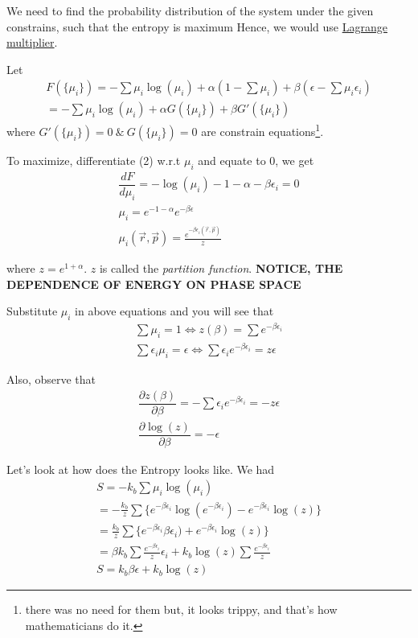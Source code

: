 \documentclass{tufte-handout}
\begin{document}
We need to find the probability distribution of the system under the given constrains, such that 
the entropy is maximum Hence, we would use \href{https://en.wikipedia.org/wiki/Lagrange_multiplier}{Lagrange 
multiplier}. 

Let 
\[\begin{gathered}
	F(\{\mu_i\}) = - \sum \mu_i \log(\mu_i) + \alpha (1 - 
\sum \mu_i) + \beta (\epsilon - \sum \mu_i \epsilon_i) \\
= - \sum \mu_i \log(\mu_i) + \alpha G(\{\mu_i\}) + \beta G'(\{\mu_i\}) \tag*{2}
\end{gathered}\] 
where \(G'(\{\mu_i\}) = 0 \ \& \ G(\{\mu_i\}) = 0\) are constrain equations\footnote{
	there was no need for them but, it looks trippy, and that's how mathematicians do it. 
}. 

To maximize, differentiate (2) w.r.t \(\mu_i\) and equate to \(0\), we get
\[\begin{gathered}
	\dfrac{d F}{d \mu_i}= - \log(\mu_i) - 1 - \alpha - \beta  \epsilon_i =0 \\
	\mu_i = e^{-1 - \alpha} e^{-\beta \epsilon}\\
	\boxed{\mu_i(\vec{r}, \vec{p}) = \frac{e^{-\beta \epsilon_i(\vec{r}, \vec{p})}}{z}}
\end{gathered}\] 

where \(z = e^{1 + \alpha}\). \(z\) is called the \textit{partition function}. \textbf{NOTICE, THE DEPENDENCE OF 
ENERGY ON PHASE SPACE}

Substitute \(\mu_i\) in above equations and you will see that 
\[\begin{gathered}
	\sum \mu_i = 1 \Longleftrightarrow \boxed{z(\beta) = \sum e^{-\beta \epsilon_i}}\\
	\sum \epsilon_i \mu_i = \epsilon \Longleftrightarrow \sum \epsilon_i  
	e^{-\beta \epsilon_i} = z \epsilon
\end{gathered}\]

Also, observe that 
\[\begin{gathered}
	\dfrac{\partial z(\beta)}{\partial \beta} = - \sum \epsilon_i e^{-\beta \epsilon_i}= -z\epsilon\\
	\boxed{\dfrac{\partial \log(z)}{\partial \beta} = - \epsilon}
\end{gathered}\]

Let's look at how does the Entropy looks like. We had 
\[\begin{gathered}
	S = -k_b \sum \mu_i \log(\mu_i)\\
	= -\frac{k_b}{z} \sum \{ e^{-\beta \epsilon_i} \log(e^{-\beta \epsilon_i}) 
	- e^{-\beta \epsilon_i} \log(z)\}\\
	= \frac{k_b}{z} \sum \{ e^{-\beta \epsilon_i}{\beta \epsilon_i}) 
	+ e^{-\beta \epsilon_i} \log(z)\}\\
	= \beta k_b \sum \frac{e^{-\beta \epsilon_i}}{z} \epsilon_i  + k_b \log(z)
	\sum \frac{e^{-\beta \epsilon_i}}{z}\\
	\boxed{S = k_b\beta \epsilon + k_b \log(z)}
\end{gathered}\]
\end{document}
